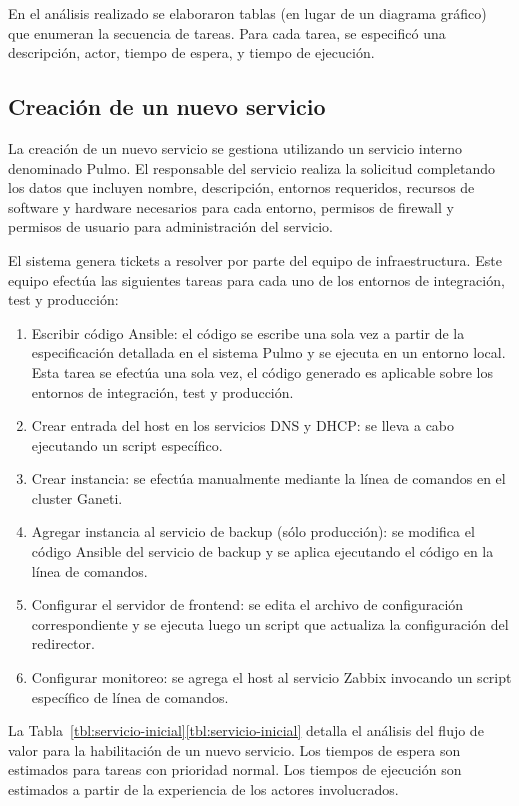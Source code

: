 En el análisis realizado se elaboraron tablas (en lugar de un diagrama
gráfico) que enumeran la secuencia de tareas. Para cada tarea, se
especificó una descripción, actor, tiempo de espera, y tiempo de
ejecución.

\subsection{Creación de un nuevo servicio}

La creación de un nuevo servicio se gestiona utilizando un servicio
interno denominado Pulmo. El responsable del servicio realiza la
solicitud completando los datos que incluyen nombre, descripción,
entornos requeridos, recursos de software y hardware necesarios para
cada entorno, permisos de firewall y permisos de usuario para
administración del servicio.

El sistema genera tickets a resolver por parte del equipo de
infraestructura. Este equipo efectúa las siguientes tareas para cada
uno de los entornos de integración, test y producción:

\begin{enumerate}
\item Escribir código Ansible: el código se escribe una sola vez a
  partir de la especificación detallada en el sistema Pulmo y se
  ejecuta en un entorno local. Esta tarea se efectúa una sola vez, el
  código generado es aplicable sobre los entornos de integración, test
  y producción.
\item Crear entrada del host en los servicios DNS y DHCP: se lleva a
  cabo ejecutando un script específico.
\item Crear instancia: se efectúa manualmente mediante la línea de
  comandos en el cluster Ganeti.
\item Agregar instancia al servicio de backup (sólo producción): se
  modifica el código Ansible del servicio de backup y se aplica
  ejecutando el código en la línea de comandos.
\item Configurar el servidor de frontend: se edita el archivo de
  configuración correspondiente y se ejecuta luego un script que
  actualiza la configuración del redirector.
\item Configurar monitoreo: se agrega el host al servicio Zabbix
  invocando un script específico de línea de comandos.
\end{enumerate}
La \iflatexml{}Tabla~\ref{tbl:servicio-inicial}\else\autoref{tbl:servicio-inicial}\fi
detalla el análisis del flujo de valor para la
habilitación de un nuevo servicio. Los tiempos de espera son estimados
para tareas con prioridad normal. Los tiempos de ejecución son
estimados a partir de la experiencia de los actores involucrados.

